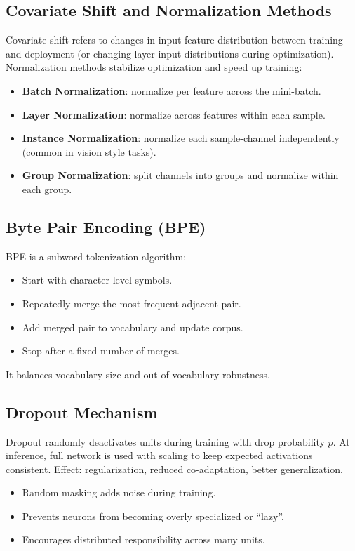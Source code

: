 \documentclass[10pt,a4paper]{article}
\begin{document}
\subsection{Covariate Shift and Normalization Methods}
Covariate shift refers to changes in input feature distribution between training and deployment (or changing layer input distributions during optimization).  
Normalization methods stabilize optimization and speed up training:
\begin{itemize}
    \item \textbf{Batch Normalization}: normalize per feature across the mini-batch.
    \item \textbf{Layer Normalization}: normalize across features within each sample.
    \item \textbf{Instance Normalization}: normalize each sample-channel independently (common in vision style tasks).
    \item \textbf{Group Normalization}: split channels into groups and normalize within each group.
\end{itemize}


\subsection{Byte Pair Encoding (BPE)}
BPE is a subword tokenization algorithm:
\begin{itemize}
    \item Start with character-level symbols.
    \item Repeatedly merge the most frequent adjacent pair.
    \item Add merged pair to vocabulary and update corpus.
    \item Stop after a fixed number of merges.
\end{itemize}
It balances vocabulary size and out-of-vocabulary robustness.

\subsection{Dropout Mechanism}
Dropout randomly deactivates units during training with drop probability $p$.  
At inference, full network is used with scaling to keep expected activations consistent.  
Effect: regularization, reduced co-adaptation, better generalization.
\begin{itemize}
    \item Random masking adds noise during training.
    \item Prevents neurons from becoming overly specialized or ``lazy''.
    \item Encourages distributed responsibility across many units.
\end{itemize}
\end{document}
